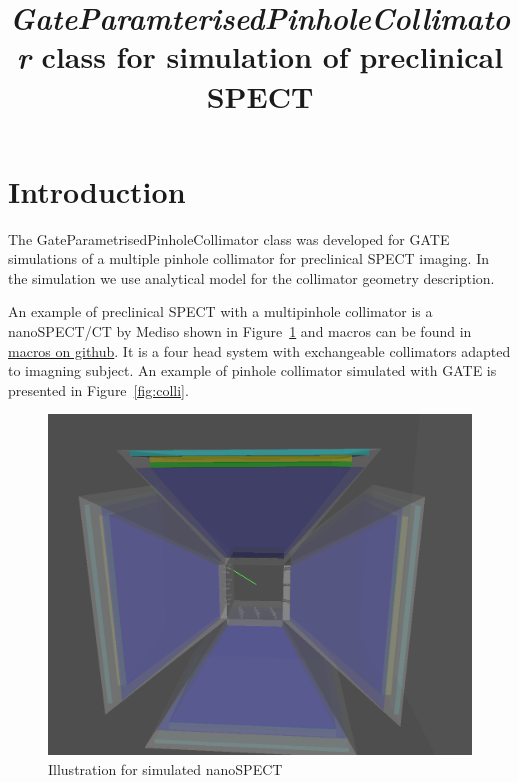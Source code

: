 \documentclass[12pt]{article}
\begin{document}
\title{\textit{GateParamterisedPinholeCollimator} class for simulation of preclinical SPECT}
\maketitle
\tableofcontents
\newpage



\pagebreak


\section{Introduction}
The GateParametrisedPinholeCollimator class was developed for GATE simulations of a multiple pinhole collimator for preclinical SPECT imaging.
In the simulation we use analytical model for the collimator geometry description.

An example of preclinical SPECT with a multipinhole collimator is a nanoSPECT/CT by Mediso shown in Figure~\ref{fig:scanner} and macros can be found in \href{https://github.com/kochebina/ParametrisedPinholeCollimator/tree/main/macros}{macros on github}. It is a four head system with exchangeable collimators adapted to imagning subject. An example of pinhole collimator simulated with GATE is presented in Figure~\ref{fig:colli}.
 
\begin{figure}[htp]
\centering
\includegraphics[scale=0.3]{figs/scanner.png}
\caption{Illustration for simulated nanoSPECT}
\label{fig:scanner}
\end{figure}
\end{document}
